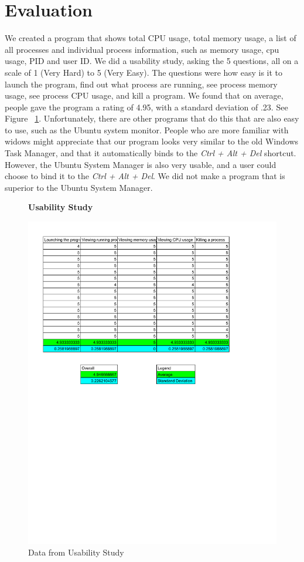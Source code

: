 \documentclass[12pt]{article}
\begin{document}
	\section{Evaluation}
	We created a program that shows total CPU usage, total memory usage, a list of all processes and individual process information, such as memory usage, cpu usage, PID and user ID. We did a usability study, asking the 5 questions, all on a scale of 1 (Very Hard) to 5 (Very Easy). The questions were how easy is it to launch the program, find out what process are running, see process memory usage, see process CPU usage, and kill a program. We found that on average, people gave the program a rating of 4.95, with a standard deviation of .23. See Figure ~\ref{figUsage}. Unfortunately, there are other programs that do this that are also easy to use, such as the Ubuntu system monitor. People who are more familiar with widows might appreciate that our program looks very similar to the old Windows Task Manager, and that it automatically binds to the \emph{Ctrl + Alt + Del} shortcut. However, the Ubuntu System Manager is also very usable, and a user could choose to bind it to the \emph{Ctrl + Alt + Del}. We did not make a program that is superior to the Ubuntu System Manager.
	\begin{figure}[h!]
		\centering
		\textbf{Usability Study}\par\medskip
		\includegraphics[scale=.7]{usageStudy}
		\caption{Data from Usability Study}
		\label{figUsage}
	\end{figure}
	
\end{document}
